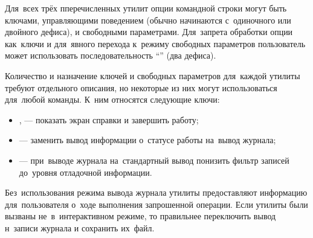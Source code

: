 Для~всех трёх пперечисленных утилит опции командной строки могут быть ключами, управляющими поведением (обычно начинаются с~одиночного или двойного дефиса), и свободными параметрами.
Для~запрета обработки опции как~ключи и для~явного перехода к~режиму свободных параметров пользователь может использовать последовательность ``\CODE{-~-}'' (два дефиса). %

Количество и назначение ключей и свободных параметров для~каждой утилиты требуют отдельного   описания,
но некоторые из них могут использоваться для~любой команды. 
К~ним относятся следующие ключи:

\begin{itemize}

\item {
,  --- показать экран справки и завершить работу; %
}

\item {
 --- заменить вывод информации о~статусе работы на~вывод журнала; %
}

\item {
 --- при~выводе журнала  на~стандартный вывод понизить фильтр записей до~уровня отладочной информации. %
}

\end{itemize}

Без~использования режима вывода журнала утилиты предоставляют информацию для~пользователя о~ходе выполнения запрошенной операции.
Если утилиты были вызваны не~в~интерактивном режиме, то правильнее переключить вывод н~записи журнала и сохранить их~файл. 

